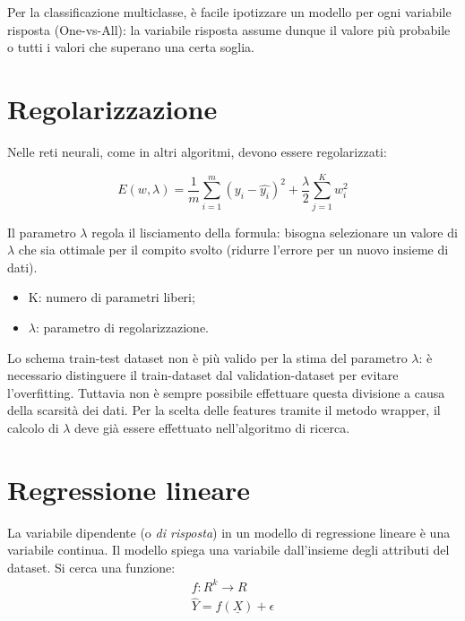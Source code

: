\documentclass[11pt, a4page, twocolumn]{article}
\begin{document}
Per la classificazione multiclasse, è facile ipotizzare un modello per ogni variabile risposta (One-vs-All): la variabile risposta assume dunque il valore più probabile o tutti i valori che superano una certa soglia.


\section{Regolarizzazione}
Nelle reti neurali, come in altri algoritmi, devono essere
regolarizzati:

\begin{equation*}
  E(w, \lambda{}) = \frac{1}{m} \sum^m_{i=1}{(y_i - \widehat{y_i})^2} +
    \frac{\lambda{}}{2} \sum^K_{j=1}{w_i^2}
\end{equation*}
  
Il parametro $\lambda$ regola il lisciamento della formula: bisogna selezionare un valore di $\lambda$ che sia ottimale per il compito svolto (ridurre l'errore per un nuovo insieme di dati).
\begin{itemize}
  \item K: numero di parametri liberi;
  \item $\lambda$: parametro di regolarizzazione.
\end{itemize}

Lo schema train-test dataset non è più valido per la stima del parametro $\lambda$: è necessario distinguere il train-dataset dal validation-dataset per evitare l'overfitting.
Tuttavia non è sempre possibile effettuare questa divisione a causa della scarsità dei dati. \newline
Per la scelta delle features tramite il metodo wrapper, il calcolo di $\lambda$ deve già essere effettuato nell'algoritmo di ricerca. \newline


\section{Regressione lineare}
La variabile dipendente (o \textit{di risposta}) in un modello di regressione lineare è una variabile continua.
Il modello spiega una variabile dall'insieme degli attributi del dataset.
Si cerca una funzione: 
\begin{align*}
  f : R^k \rightarrow R \\
  \widehat{Y} = f(\underline{X}) + \epsilon
\end{align*}
\end{document}
